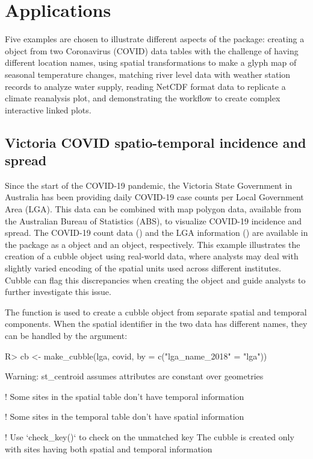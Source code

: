 \documentclass[
  shortnames]{jss}
\begin{document}
\hypertarget{examples}{%
\section{Applications}\label{examples}}

Five examples are chosen to illustrate different aspects of the  package: creating a  object from two Coronavirus (COVID) data tables with the challenge of having different location names, using spatial transformations to make a glyph map of seasonal temperature changes, matching river level data with weather station records to analyze water supply, reading NetCDF format data to replicate a climate reanalysis plot, and demonstrating the workflow to create complex interactive linked plots.

\hypertarget{covid}{%
\subsection{Victoria COVID spatio-temporal incidence and spread}\label{covid}}

Since the start of the COVID-19 pandemic, the Victoria State Government in Australia has been providing daily COVID-19 case counts per Local Government Area (LGA). This data can be combined with map polygon data, available from the Australian Bureau of Statistics (ABS), to visualize COVID-19 incidence and spread. The COVID-19 count data () and the LGA information () are available in the  package as a  object and an  object, respectively. This example illustrates the creation of a cubble object using real-world data, where analysts may deal with slightly varied encoding of the spatial units used across different institutes. Cubble can flag this discrepancies when creating the object and guide analysts to further investigate this issue.

The function  is used to create a cubble object from separate spatial and temporal components. When the spatial identifier in the two data has different names, they can be handled by the  argument:

\begin{CodeChunk}
\begin{CodeInput}
R> cb <- make_cubble(lga, covid, by = c("lga_name_2018" = "lga"))
\end{CodeInput}
\begin{CodeOutput}
Warning: st_centroid assumes attributes are constant over geometries
\end{CodeOutput}
\begin{CodeOutput}
! Some sites in the spatial table don't have temporal information
\end{CodeOutput}
\begin{CodeOutput}
! Some sites in the temporal table don't have spatial information
\end{CodeOutput}
\begin{CodeOutput}
! Use `check_key()` to check on the unmatched key
The cubble is created only with sites having both spatial and
temporal information
\end{CodeOutput}
\end{CodeChunk}
\end{document}
